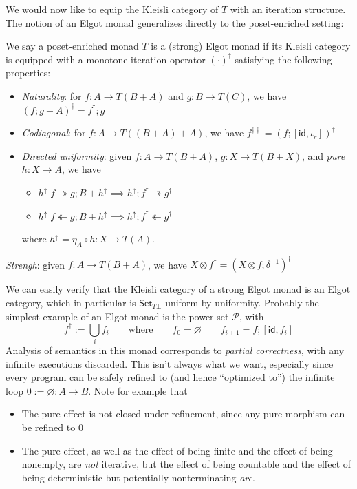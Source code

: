 \documentclass[acmsmall,screen,anonymous,review]{acmart}
\newcommand{\mc}[1]{\ensuremath{\mathcal{#1}}}
\newcommand{\ms}[1]{\ensuremath{\mathsf{#1}}}
\newcommand{\tref}{\twoheadrightarrow}
\newcommand{\antitref}{\twoheadleftarrow}
\begin{document}
We would now like to equip the Kleisli category of $T$ with an iteration structure. The notion of an
Elgot monad \cite{goncharov-16-complete-elgot} generalizes directly to the poset-enriched setting:
\begin{definition}
  We say a poset-enriched monad $T$ is a (strong) Elgot monad if its Kleisli category is equipped
  with a monotone iteration operator $(\cdot)^\dagger$ satisfying the following properties:
  \begin{itemize}
    \item \emph{Naturality}: for $f : A \to T (B + A)$ and $g : B \to T(C)$, we have $(f ; g +
    A)^\dagger = f^\dagger ; g$
    \item \emph{Codiagonal}: for $f: A \to T ((B + A) + A)$, we have $f^{\dagger\dagger} = (f ;
    [\ms{id}, \iota_r])^\dagger$
    \item \emph{Directed uniformity}: given $f : A \to T(B + A)$, $g: X \to T(B + X)$, and
    \emph{pure} $h : X \to A$, we have
    \begin{itemize}
      \item $h^\uparrow\;f \tref g ; B + h^\uparrow 
        \implies h^\uparrow ; f^\dagger \tref g^\dagger$
      \item$h^\uparrow\;f \antitref g ; B + h^\uparrow 
        \implies h^\uparrow ; f^\dagger \antitref g^\dagger$
    \end{itemize}
    where $h^\uparrow = \eta_A \circ h : X \to T(A)$.
  \end{itemize}
  \item \emph{Strengh}: given $f : A \to T(B + A)$, we have 
  $X \otimes f^\dagger = (X \otimes f ; \delta^{-1})^\dagger$
\end{definition}
We can easily verify that the Kleisli category of a strong Elgot monad is an Elgot category, which
in particular is $\ms{Set}_{T\bot}$-uniform by uniformity. Probably the simplest example of an Elgot
monad is the power-set $\mc{P}$, with
\begin{equation*}
  f^\dagger := \bigcup_i f_i \qquad \text{where} \qquad
  f_0 = \varnothing \qquad f_{i + 1} = f ; [\ms{id}, f_i]
\end{equation*}
Analysis of semantics in this monad corresponds to \emph{partial correctness}, with any infinite
executions discarded. This isn't always what we want, especially since every program can be safely
refined to (and hence ``optimized to'') the infinite loop $0 := \varnothing: A \to B$. Note for
example that
\begin{itemize}
  \item The pure effect is not closed under refinement, since any pure morphism can be refined to
  $0$
  \item The pure effect, as well as the effect of being finite and the effect of being nonempty, are
  \emph{not} iterative, but the effect of being countable and the effect of being deterministic but
  potentially nonterminating \emph{are}.
\end{itemize}
\end{document}
